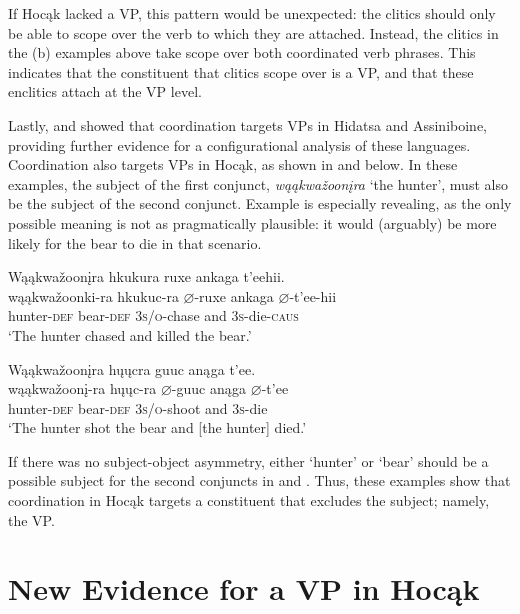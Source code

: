 \documentclass[output=paper]{LSP/langsci}
\begin{document}
If Hocąk lacked a VP, this pattern would be unexpected: the clitics should only be able to scope over the verb to which they are attached. Instead, the clitics in the (b) examples above take scope over both coordinated verb phrases. This indicates that the constituent that clitics scope over is a VP, and that these enclitics attach at the VP level. 
	
Lastly, \citet{Boyle2007} and \citet{West2003} showed that coordination targets VPs in Hidatsa and Assiniboine, providing further evidence for a configurational analysis of these languages.  Coordination also targets VPs in Hocąk, as shown in  and  below. In these examples, the subject of the first conjunct, \textit{wąąkwa\v{z}oon\k{i}ra} `the hunter', must also be the subject of the second conjunct.  Example  is especially revealing, as the only possible meaning is not as pragmatically plausible: it would (arguably) be more likely for the bear to die in that scenario.

\begin{exe}
\ex 
\glll Wąąkwa\v{z}oon\k{i}ra 		hk{u}k{u}ra 			ruxe 				ank{a}ga 	t'eehii. \\
wąąkwa\v{z}oonk{i}-ra 	hk{u}k{u}c-ra 		$\varnothing$-ruxe  		ank{a}ga 	$\varnothing$-t'ee-hii \\
hunter-\textsc{def} 					bear-\textsc{def} 	\textsc{3s/o}-chase and 		\textsc{3s}-die-\textsc{caus} \\
\trans`The hunter chased and killed the bear.'

\ex 
\glll Wąąkwa\v{z}oon\k{i}ra 		h\k{u}\k{u}cra 		guuc 				anąga 	t'ee. \\
wąąkwa\v{z}oon\k{i}-ra 	h\k{u}\k{u}c-ra 		$\varnothing$-guuc 			anąga 	$\varnothing$-t'ee \\
hunter-\textsc{def} 		bear-\textsc{def} 	\textsc{3s/o}-shoot 		and 		\textsc{3s}-die \\
\trans `The hunter shot the bear and [the hunter] died.'
\end{exe}
	
If there was no subject-object asymmetry, either `hunter' or `bear' should be a possible subject for the second conjuncts in  and . Thus, these examples show that coordination in Hocąk targets a constituent that excludes the subject; namely, the VP.

\section{New Evidence for a VP in Hocąk}
\end{document}
